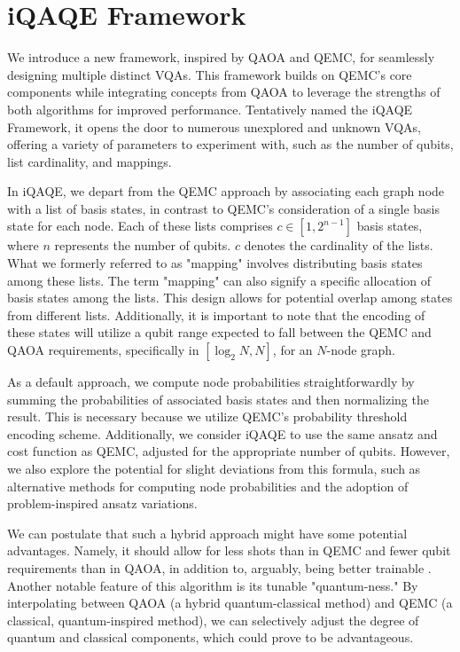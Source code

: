 \section{iQAQE Framework}
\label{sec: Methodology}

We introduce a new framework, inspired by QAOA and QEMC, for seamlessly designing multiple distinct VQAs. This framework builds on QEMC's core components while integrating concepts from QAOA to leverage the strengths of both algorithms for improved performance. Tentatively named the iQAQE Framework, it opens the door to numerous unexplored and unknown VQAs, offering a variety of parameters to experiment with, such as the number of qubits, list cardinality, and mappings.

In iQAQE, we depart from the QEMC approach by associating each graph node with a list of basis states, in contrast to QEMC's consideration of a single basis state for each node. Each of these lists comprises $c \in \left[1, 2^{n-1}\right]$ basis states, where $n$ represents the number of qubits. $c$ denotes the cardinality of the lists. What we formerly referred to as "mapping" involves distributing basis states among these lists. The term "mapping" can also signify a specific allocation of basis states among the lists. This design allows for potential overlap among states from different lists. Additionally, it is important to note that the encoding of these states will utilize a qubit range expected to fall between the QEMC and QAOA requirements, specifically in $[\log_2{N}, N]$, for an $N$-node graph.

As a default approach, we compute node probabilities straightforwardly by summing the probabilities of associated basis states and then normalizing the result. This is necessary because we utilize QEMC's probability threshold encoding scheme. Additionally, we consider iQAQE to use the same ansatz and cost function as QEMC, adjusted for the appropriate number of qubits. However, we also explore the potential for slight deviations from this formula, such as alternative methods for computing node probabilities and the adoption of problem-inspired ansatz variations.

We can postulate that such a hybrid approach might have some potential advantages. Namely, it should allow for less shots than in QEMC and fewer qubit requirements than in QAOA, in addition to, arguably, being better trainable \cite{tenecohen2023variational}. Another notable feature of this algorithm is its tunable "quantum-ness." By interpolating between QAOA (a hybrid quantum-classical method) and QEMC (a classical, quantum-inspired method), we can selectively adjust the degree of quantum and classical components, which could prove to be advantageous.

